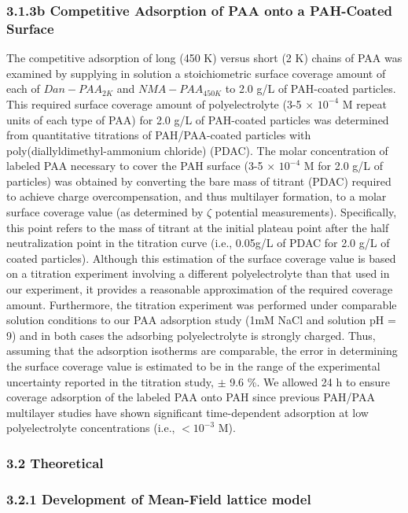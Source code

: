 \documentclass[journal=mamobx,manuscript=article]{achemso}
\begin{document}
\subsubsection{3.1.3b Competitive Adsorption of PAA onto a PAH-Coated Surface}

The competitive adsorption of long (450 K) versus short (2 K) chains of PAA was examined by supplying in solution a stoichiometric surface coverage amount of each of $Dan-PAA_{2K}$ and $NMA-PAA_{450K}$ to 2.0 g/L of PAH-coated particles.  This required surface coverage amount of polyelectrolyte (3-5 $\times$ $10^{-4}$ M repeat units of each type of PAA) for 2.0 g/L of PAH-coated particles was determined from quantitative titrations of PAH/PAA-coated particles with poly(diallyldimethyl-ammonium chloride) (PDAC).\cite{Burke2003}   The molar concentration of labeled PAA necessary to cover the PAH surface (3-5 $\times$ $10^{-4}$ M for 2.0 g/L of particles) was obtained by converting the bare mass of titrant (PDAC) required to achieve charge overcompensation, and thus multilayer formation, to a molar surface coverage value (as determined by $\zeta$ potential measurements).\cite{Burke2003}   Specifically, this point refers to the mass of titrant at the initial plateau point after the half neutralization point in the titration curve (i.e., 0.05g/L of PDAC for 2.0 g/L of coated particles).  Although this estimation of the surface coverage value is based on a titration experiment involving a different polyelectrolyte than that used in our experiment, it provides a reasonable approximation of the required coverage amount.  Furthermore, the titration experiment was performed under comparable solution conditions to our PAA adsorption study (1mM NaCl and solution pH = 9) and in both cases the adsorbing polyelectrolyte is strongly charged.  Thus, assuming that the adsorption isotherms are comparable, the error in determining the surface coverage value is estimated to be in the range of the experimental uncertainty reported in the titration study, $\pm$ 9.6 \%.  We allowed 24 h to ensure coverage adsorption of the labeled PAA onto PAH since previous PAH/PAA multilayer studies have shown significant time-dependent adsorption at low polyelectrolyte concentrations (i.e., $<10^{-3}$ M).\cite{Mermut2003}

\subsubsection{3.2 Theoretical}

\subsubsection{3.2.1 Development of Mean-Field lattice model}
\end{document}
